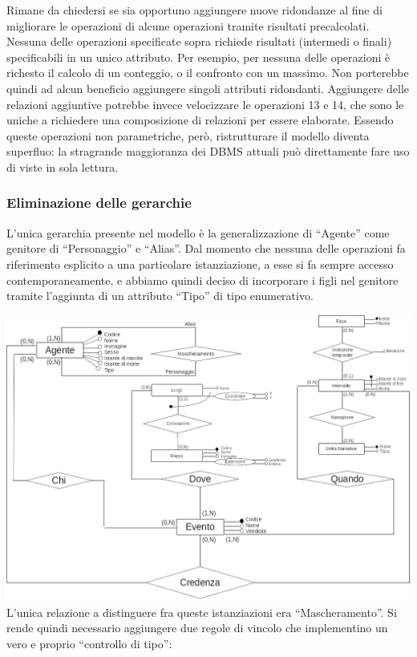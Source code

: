 \documentclass{article}
\begin{document}
Rimane da chiedersi se sia opportuno aggiungere nuove ridondanze al fine di
migliorare le operazioni di alcune operazioni tramite risultati precalcolati.
Nessuna delle operazioni specificate sopra richiede risultati (intermedi o
finali) specificabili in un unico attributo. Per esempio, per nessuna delle
operazioni è richesto il calcolo di un conteggio, o il confronto con un massimo.
Non porterebbe quindi ad alcun beneficio aggiungere singoli attributi
ridondanti. Aggiungere delle relazioni aggiuntive potrebbe invece velocizzare
le operazioni 13 e 14, che sono le uniche a richiedere una composizione di
relazioni per essere elaborate. Essendo queste operazioni non parametriche,
però, ristrutturare il modello diventa superfluo: la stragrande maggioranza dei
DBMS attuali può direttamente fare uso di viste in sola lettura.

\subsubsection{Eliminazione delle gerarchie}

L'unica gerarchia presente nel modello è la generalizzazione di ``Agente'' come
genitore di ``Personaggio'' e ``Alias''. Dal momento che nessuna delle
operazioni fa riferimento esplicito a una particolare istanziazione, a esse si
fa sempre accesso contemporaneamente, e abbiamo quindi deciso di incorporare i
figli nel genitore tramite l'aggiunta di un attributo ``Tipo'' di tipo
enumerativo.

\includegraphics[width=\linewidth]{eliminazione-gerarchie.png}
L'unica
relazione a distinguere fra queste istanziazioni era ``Mascheramento''. Si rende
quindi necessario aggiungere due regole di vincolo che implementino un vero e
proprio ``controllo di tipo'':
\end{document}
